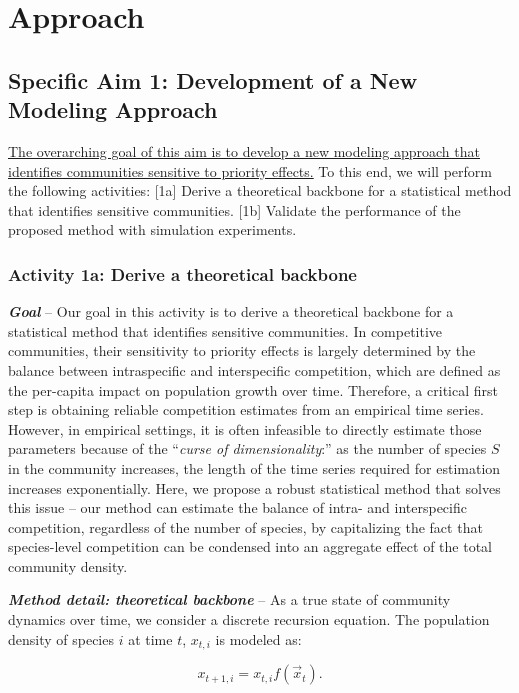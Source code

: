 \documentclass[12pt, class=article, crop=false]{standalone}
\begin{document}
\section{Approach}

\subsection*{Specific Aim 1: Development of a New Modeling Approach}

\ul{The overarching goal of this aim is to develop a new modeling approach that identifies communities sensitive to priority effects.}
To this end, we will perform the following activities:
[1a] Derive a theoretical backbone for a statistical method that identifies sensitive communities.
[1b] Validate the performance of the proposed method with simulation experiments.

\subsubsection*{Activity 1a: Derive a theoretical backbone}

\textbf{\textit{Goal}} -- 
Our goal in this activity is to derive a theoretical backbone for a statistical method that identifies sensitive communities.
In competitive communities, their sensitivity to priority effects is largely determined by the balance between intraspecific and interspecific competition, which are defined as the per-capita impact on population growth over time.
Therefore, a critical first step is obtaining reliable competition estimates from an empirical time series.
However, in empirical settings, it is often infeasible to directly estimate those parameters because of the ``\textit{curse of dimensionality}:'' as the number of species $S$ in the community increases, the length of the time series required for estimation increases exponentially.
Here, we propose a robust statistical method that solves this issue -- our method can estimate the balance of intra- and interspecific competition, regardless of the number of species, by capitalizing the fact that species-level competition can be condensed into an aggregate effect of the total community density.

\textbf{\textit{Method detail: theoretical backbone}} -- 
As a true state of community dynamics over time, we consider a discrete recursion equation. The population density of species $i$ at time $t$, $x_{t,i}$ is modeled as:

\begin{equation}
\label{eq:m0}
x_{t + 1, i} = x_{t, i} f(\overset{\rightarrow}{x}_{t}).
\end{equation}
\end{document}
